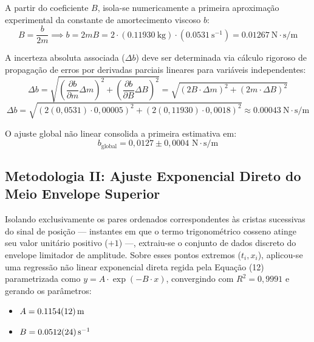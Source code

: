 \documentclass[12pt, a4paper]{article}
\begin{document}
A partir do coeficiente $B$, isola-se numericamente a primeira aproximação experimental da constante de amortecimento viscoso $b$:
\begin{equation}
    B = \frac{b}{2m} \implies b = 2mB = 2 \cdot (\SI{0,11930}{\kilo\gram}) \cdot (\SI{0,0531}{\second^{-1}}) = \SI{0,01267}{\newton\cdot\second/\meter}
\end{equation}

A incerteza absoluta associada ($\Delta b$) deve ser determinada via cálculo rigoroso de propagação de erros por derivadas parciais lineares para variáveis independentes:
\begin{equation}
    \Delta b = \sqrt{ \left( \frac{\partial b}{\partial m} \Delta m \right)^2 + \left( \frac{\partial b}{\partial B} \Delta B \right)^2 } = \sqrt{ \left( 2B \cdot \Delta m \right)^2 + \left( 2m \cdot \Delta B \right)^2 }
\end{equation}
\begin{equation}
    \Delta b = \sqrt{ \left( 2(0,0531) \cdot 0,00005 \right)^2 + \left( 2(0,11930) \cdot 0,0018 \right)^2 } \approx \SI{0,00043}{\newton\cdot\second/\meter}
\end{equation}

O ajuste global não linear consolida a primeira estimativa em:
\begin{equation}
    b_{\text{global}} = 0,0127 \pm 0,0004 \text{ N}\cdot\text{s/m}
\end{equation}

\subsection{Metodologia II: Ajuste Exponencial Direto do Meio Envelope Superior}
Isolando exclusivamente os pares ordenados correspondentes às cristas sucessivas do sinal de posição --- instantes em que o termo trigonométrico cosseno atinge seu valor unitário positivo ($+1$) ---, extraiu-se o conjunto de dados discreto do envelope limitador de amplitude. Sobre esses pontos extremos ($t_i, x_i$), aplicou-se uma regressão não linear exponencial direta regida pela Equação (12) parametrizada como $y = A \cdot \exp(-B \cdot x)$, convergindo com $R^2 = 0,9991$ e gerando os parâmetros:
\begin{itemize}
    \item $A = \SI{0,1154 \pm 0,0012}{\meter}$
    \item $B = \SI{0,0512 \pm 0,0024}{\second^{-1}}$
\end{itemize}
\end{document}
